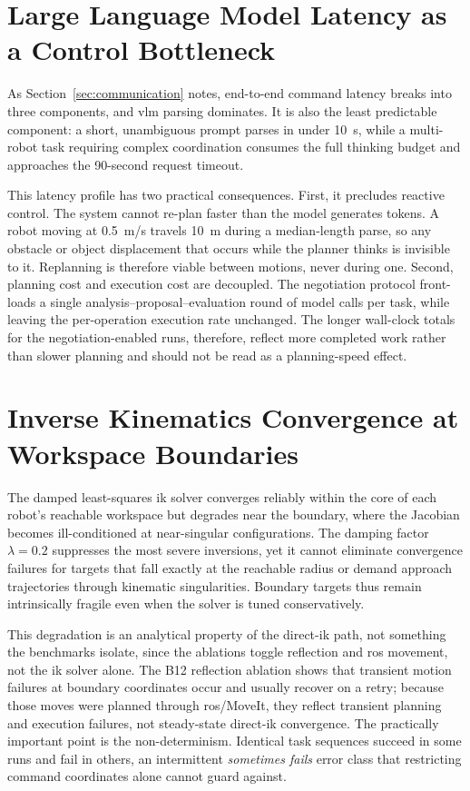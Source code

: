 \section{Large Language Model Latency as a Control Bottleneck}
As Section~\ref{sec:communication} notes, end-to-end command latency breaks into three components, and \gls{vlm} parsing dominates. It is also the least predictable component: a short, unambiguous prompt parses in under 10~s, while a multi-robot task requiring complex coordination consumes the full thinking budget and approaches the 90-second request timeout.

This latency profile has two practical consequences. First, it precludes reactive control. The system cannot re-plan faster than the model generates tokens. A robot moving at 0.5~m/s travels 10~m during a median-length parse, so any obstacle or object displacement that occurs while the planner thinks is invisible to it. Replanning is therefore viable between motions, never during one. Second, planning cost and execution cost are decoupled. The negotiation protocol front-loads a single analysis–proposal–evaluation round of model calls per task, while leaving the per-operation execution rate unchanged. The longer wall-clock totals for the negotiation-enabled runs, therefore, reflect more completed work rather than slower planning and should not be read as a planning-speed effect.

\section{Inverse Kinematics Convergence at Workspace Boundaries}
The damped least-squares \gls{ik} solver converges reliably within the core of each robot’s reachable workspace but degrades near the boundary, where the Jacobian becomes ill-conditioned at near-singular configurations. The damping factor $\lambda = 0.2$ suppresses the most severe inversions, yet it cannot eliminate convergence failures for targets that fall exactly at the reachable radius or demand approach trajectories through kinematic singularities. Boundary targets thus remain intrinsically fragile even when the solver is tuned conservatively.

This degradation is an analytical property of the direct-\gls{ik} path, not something the benchmarks isolate, since the ablations toggle reflection and \gls{ros} movement, not the \gls{ik} solver alone. The B12 reflection ablation shows that transient motion failures at boundary coordinates occur and usually recover on a retry; because those moves were planned through \gls{ros}/MoveIt, they reflect transient planning and execution failures, not steady-state direct-\gls{ik} convergence. The practically important point is the non-determinism. Identical task sequences succeed in some runs and fail in others, an intermittent \textit{sometimes fails} error class that restricting command coordinates alone cannot guard against.

